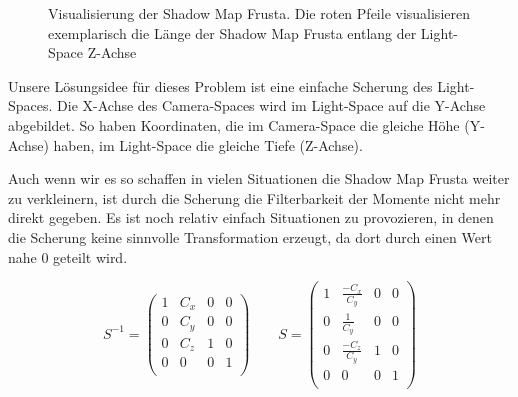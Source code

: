 \documentclass[runningheaders,a4paper]{llncs}
\begin{document}
\begin{figure}
	\centering
	
	\caption{Visualisierung der Shadow Map Frusta. Die roten Pfeile visualisieren exemplarisch die Länge der Shadow Map Frusta entlang der Light-Space Z-Achse}
\end{figure}

Unsere Lösungsidee für dieses Problem ist eine einfache Scherung des Light-Spaces.
Die X-Achse des Camera-Spaces wird im Light-Space auf die Y-Achse abgebildet.
So haben Koordinaten, die im Camera-Space die gleiche Höhe (Y-Achse) haben, im Light-Space die gleiche Tiefe (Z-Achse).

Auch wenn wir es so schaffen in vielen Situationen die Shadow Map Frusta weiter zu verkleinern, ist durch die Scherung die Filterbarkeit der Momente \cite{msm} nicht mehr direkt gegeben.
Es ist noch relativ einfach Situationen zu provozieren, in denen die Scherung keine sinnvolle Transformation erzeugt, da dort durch einen Wert nahe $0$ geteilt wird.

\begin{equation}
	S^{-1} = \left(\begin{array}{cccc}
		1 & C_x & 0 & 0 \\
		0 & C_y & 0 & 0 \\
		0 & C_z & 1 & 0 \\
		0 & 0 & 0 & 1 \\
	\end{array}\right)
	\qquad
	S = \left(\begin{array}{cccc}
	1 & \frac{-C_x}{C_y} & 0 & 0 \\
	0 & \frac{1}{C_y} & 0 & 0 \\
	0 & \frac{-C_z}{C_y} & 1 & 0 \\
	0 & 0 & 0 & 1 \\
	\end{array}\right)
\end{equation}
\end{document}
